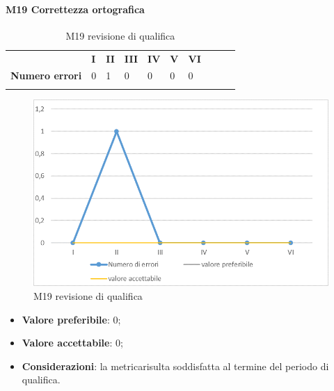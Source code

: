 \paragraph{M19 Correttezza ortografica} \mbox{}
\begin{longtable}[H!] {						
		>{}p{50mm}  		
		>{}p{8mm}
		>{}p{8mm}		
		>{}p{8mm}		
		>{}p{8mm}		
		>{}p{8mm}		
		>{}p{8mm}
		>{}p{8mm}
		>{}p{8mm}
		>{}p{8mm}
	}
	\rowcolor{gray!50}
	\textbf{} & \textbf{I} & \textbf{II} & \textbf{III} & \textbf{IV} & \textbf{V} & \textbf{VI} \TBstrut \\ [2mm]
	\textbf{Numero errori} & 0 & 1 & 0 & 0 & 0 & 0 \TBstrut \\ [2mm]
	\rowcolor{white}
	\caption{M19 revisione di qualifica}
\end{longtable}
\begin{figure}[H] 	
	\includegraphics[width=\linewidth]{./img/grafici/RQ19.png}	
	\caption{M19 revisione di qualifica}	
\end{figure}
\begin{itemize}
	\item \textbf{Valore preferibile}: 0;
	\item \textbf{Valore accettabile}: 0;
	\item \textbf{Considerazioni}: la metrica\glosp risulta soddisfatta al termine del periodo di qualifica.
\end{itemize}

